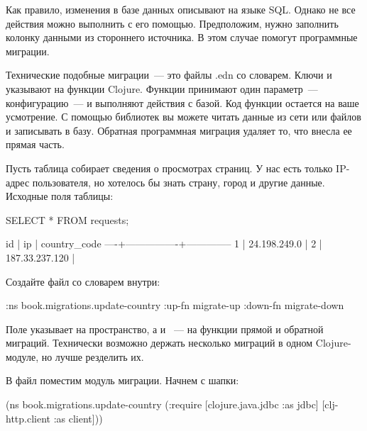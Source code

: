 Как правило, изменения в базе данных описывают на языке SQL. Однако не все действия можно выполнить с его помощью. Предположим, нужно заполнить колонку данными из стороннего источника. В этом случае помогут программные миграции.

Технические подобные миграции~--- это файлы .edn со словарем. Ключи  и  указывают на функции Clojure. Функции принимают один параметр~--- конфигурацию~--- и выполняют действия с базой. Код функции остается на ваше усмотрение. С помощью библиотек вы можете читать данные из сети или файлов и записывать в базу. Обратная программная миграция удаляет то, что внесла ее прямая часть.

Пусть таблица  собирает сведения о просмотрах страниц. У нас есть только IP-адрес пользователя, но хотелось бы знать страну, город и другие данные. Исходные поля таблицы:

\begin{english}
  \begin{sql}
SELECT * FROM requests;
  \end{sql}
\end{english}

\begin{english}
  \begin{text}
 id |       ip       | country_code
----+----------------+--------------
  1 | 24.198.249.0   |
  2 | 187.33.237.120 |
  \end{text}
\end{english}


Создайте файл  со словарем внутри:

\begin{english}
  \begin{clojure}
{:ns book.migrations.update-country
 :up-fn migrate-up
 :down-fn migrate-down}
  \end{clojure}
\end{english}

Поле  указывает на пространство, а  и ~--- на функции прямой и обратной миграций. Технически возможно держать несколько миграций в одном Clojure-модуле, но лучше резделить их.

В файл  поместим модуль миграции. Начнем с шапки:

\begin{english}
  \begin{clojure}
(ns book.migrations.update-country
  (:require
   [clojure.java.jdbc :as jdbc]
   [clj-http.client :as client]))
  \end{clojure}
\end{english}

